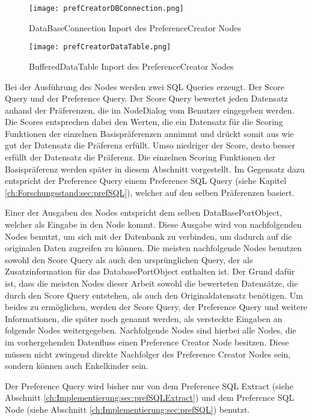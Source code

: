 \begin{figure}[H]
	\centering
	\texttt{[image: prefCreatorDBConnection.png]}
	\caption{DataBaseConnection Inport des PreferenceCreator Nodes}
	\label{img:prefCreatorDBConnection}
\end{figure}

\begin{figure}[H]
	\centering
	\texttt{[image: prefCreatorDataTable.png]}
	\caption{BufferedDataTable Inport des PreferenceCreator Nodes}
	\label{img:prefCreatorDataTable}
\end{figure}

Bei der Ausführung des Nodes werden zwei SQL Queries erzeugt. Der Score Query und der Preference Query. Der Score Query bewertet jeden Datensatz anhand der Präferenzen, die im NodeDialog vom Benutzer eingegeben werden. Die Scores entsprechen dabei den Werten, die ein Datensatz für die Scoring Funktionen der einzelnen Basispräferenzen annimmt und drückt somit aus wie gut der Datensatz die Präferenz erfüllt. Umso niedriger der Score, desto besser erfüllt der Datensatz die Präferenz. Die einzelnen Scoring Funktionen der Basispräferenz werden später in diesem Abschnitt vorgestellt.
Im Gegensatz dazu entspricht der Preference Query einem Preference SQL Query (siehe Kapitel \ref{ch:Forschungsstand:sec:prefSQL}), welcher auf den selben Präferenzen basiert. 

Einer der Ausgaben des Nodes entspricht dem selben DataBasePortObject, welcher als Eingabe in den Node kommt. Diese Ausgabe wird von nachfolgenden Nodes benutzt, um sich mit der Datenbank zu verbinden, um dadurch auf die originalen Daten zugreifen zu können. Die meisten nachfolgende Nodes benutzen sowohl den Score Query als auch den ursprünglichen Query, der als  Zusatzinformation für das DatabasePortObject enthalten ist. Der Grund dafür ist, dass die meisten Nodes dieser Arbeit sowohl die bewerteten Datensätze, die durch den Score Query entstehen, als auch den Originaldatensatz benötigen. Um beides zu ermöglichen, werden der Score Query, der Preference Query und weitere Informationen, die später noch genannt werden, als versteckte Eingaben an folgende Nodes weitergegeben. Nachfolgende Nodes sind hierbei alle Nodes, die im vorhergehenden Datenfluss einen Preference Creator Node besitzen. Diese müssen nicht zwingend direkte Nachfolger des Preference Creator Nodes sein, sondern können auch Enkelkinder sein.

Der Preference Query wird bisher nur von dem Preference SQL Extract (siehe Abschnitt \ref{ch:Implementierung:sec:prefSQLExtract}) und dem Preference SQL Node (siehe Abschnitt \ref{ch:Implementierung:sec:prefSQL}) benutzt. 

